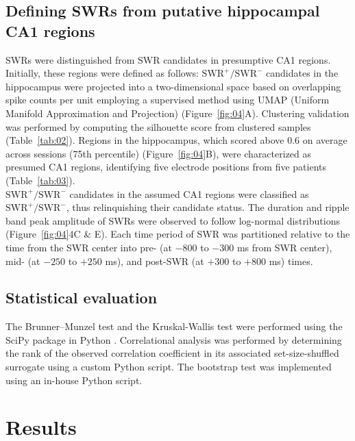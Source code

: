 \documentclass[final,3p,times,twocolumn]{elsarticle}
\begin{document}
\subsection{Defining SWRs from putative hippocampal CA1 regions}
SWRs were distinguished from SWR candidates in presumptive CA1 regions. Initially, these regions were defined as follows: $\textrm{SWR}^+/\textrm{SWR}^-$ candidates in the hippocampus were projected into a two-dimensional space based on overlapping spike counts per unit employing a supervised method using UMAP (Uniform Manifold Approximation and Projection) \cite{mcinnes_umap_2018} (Figure~\ref{fig:04}A). Clustering validation was performed by computing the silhouette score \cite{rousseeuw_silhouettes_1987} from clustered samples (Table~\ref{tab:02}). Regions in the hippocampus, which scored above 0.6 on average across sessions (75th percentile) (Figure~\ref{fig:04}B), were characterized as presumed CA1 regions, identifying five electrode positions from five patients (Table~\ref{tab:03}).
\\
\indent
$\textrm{SWR}^+/\textrm{SWR}^-$ candidates in the assumed CA1 regions were classified as $\textrm{SWR}^+/\textrm{SWR}^-$, thus relinquishing their candidate status. The duration and ripple band peak amplitude of SWRs were observed to follow log-normal distributions (Figure~\ref{fig:04}4C \& E). Each time period of SWR was partitioned relative to the time from the SWR center into pre- (at $-800$ to $-300$ ms from SWR center), mid- (at $-250$ to $+250$ ms), and post-SWR (at $+300$ to $+800$ ms) times.

\subsection{Statistical evaluation}
The Brunner--Munzel test and the Kruskal-Wallis test were performed using the SciPy package in Python \cite{virtanen_scipy_2020}. Correlational analysis was performed by determining the rank of the observed correlation coefficient in its associated set-size-shuffled surrogate using a custom Python script. The bootstrap test was implemented using an in-house Python script.

\label{sec:methods}
\section{Results}
\end{document}
